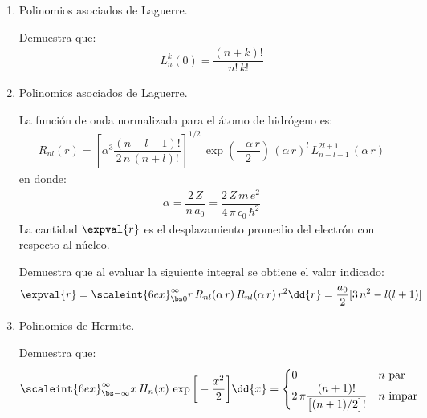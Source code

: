\begin{enumerate}
\item Polinomios asociados de Laguerre.
\par
\noindent
Demuestra que:
\begin{align*}
L_{n}^{k} (0) = \dfrac{(n + k)!}{n! \, k!}
\end{align*}
\item Polinomios asociados de Laguerre.
\par
\noindent
La función de onda normalizada para el átomo de hidrógeno es:
\begin{align*}
R_{n l} (r) = \left[ \alpha^{3} \dfrac{(n -l -1)!}{2 \, n \, (n + l)!} \right]^{1/2} \, \exp \left( \dfrac{-\alpha \, r}{2} \right) \, (\alpha \, r)^{l} \, L_{n - l +1}^{2 l +1} \, (\alpha \, r) 
\end{align*}
en donde: 
\begin{align*}
\alpha = \dfrac{2 \, Z}{n \, a_{0}} = \dfrac{2 \, Z \, m \, e^{2}}{4 \, \pi \, \epsilon_{0} \, \hbar^{2}}
\end{align*}
La cantidad $\expval{r}$ es el desplazamiento promedio del electrón con respecto al núcleo.
\par
Demuestra que al evaluar la siguiente integral se obtiene el valor indicado:
\begin{align*}
\expval{r} = \scaleint{6ex}_{\bs 0}^{\infty} r \, R_{n l} (\alpha \, r) \, R_{n l} (\alpha \, r) \, r^{2} \dd{r} = \dfrac{a_{0}}{2} [3 \, n^{2} - l (l + 1)]
\end{align*}
\item Polinomios de Hermite.
\par
\noindent
Demuestra que:
\begin{align*}
\scaleint{6ex}_{\bs - \infty}^{\infty} x \, H_{n}(x) \, \exp \bigg[ - \dfrac{x^{2}}{2} \bigg] \dd{x} = \begin{cases}
0 & n \mbox{ par} \\
2 \, \pi \dfrac{(n + 1)!}{\big[ (n + 1)/2 \big]!} & n \mbox{ impar}
\end{cases}
\end{align*}


\end{enumerate}
